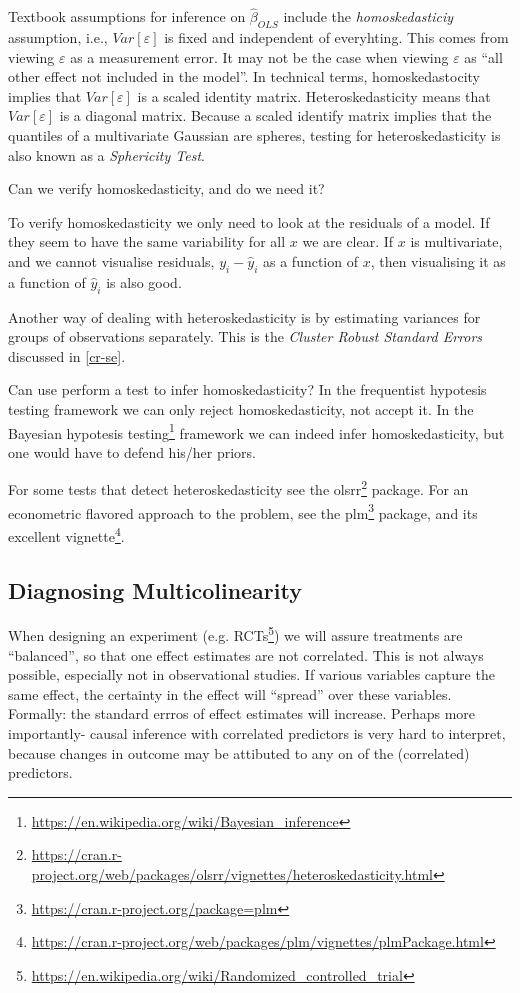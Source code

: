 \documentclass[]{book}
\renewcommand{\href}[2]{#2\footnote{\url{#1}}}
\theoremstyle{definition}
\theoremstyle{definition}
\theoremstyle{definition}
\theoremstyle{remark}
\begin{document}
Textbook assumptions for inference on \(\hat \beta_{OLS}\) include the \emph{homoskedasticiy} assumption, i.e., \(Var[\varepsilon]\) is fixed and independent of everyhting.
This comes from viewing \(\varepsilon\) as a measurement error.
It may not be the case when viewing \(\varepsilon\) as ``all other effect not included in the model''.
In technical terms, homoskedastocity implies that \(Var[\varepsilon]\) is a scaled identity matrix.
Heteroskedasticity means that \(Var[\varepsilon]\) is a diagonal matrix.
Because a scaled identify matrix implies that the quantiles of a multivariate Gaussian are spheres, testing for heteroskedasticity is also known as a \emph{Sphericity Test}.

Can we verify homoskedasticity, and do we need it?

To verify homoskedasticity we only need to look at the residuals of a model. If they seem to have the same variability for all \(x\) we are clear.
If \(x\) is multivariate, and we cannot visualise residuals, \(y_i-\hat y_i\) as a function of \(x\), then visualising it as a function of \(\hat y_i\) is also good.

Another way of dealing with heteroskedasticity is by estimating variances for groups of observations separately.
This is the \emph{Cluster Robust Standard Errors} discussed in \ref{cr-se}.

Can use perform a test to infer homoskedasticity?
In the frequentist hypotesis testing framework we can only reject homoskedasticity, not accept it.
In the \href{https://en.wikipedia.org/wiki/Bayesian_inference}{Bayesian hypotesis testing} framework we can indeed infer homoskedasticity, but one would have to defend his/her priors.

For some tests that detect heteroskedasticity see the \href{https://cran.r-project.org/web/packages/olsrr/vignettes/heteroskedasticity.html}{olsrr} package.
For an econometric flavored approach to the problem, see the \href{https://cran.r-project.org/package=plm}{plm} package, and its excellent \href{https://cran.r-project.org/web/packages/plm/vignettes/plmPackage.html}{vignette}.

\hypertarget{diagnosing-multicolinearity}{%
\subsection{Diagnosing Multicolinearity}\label{diagnosing-multicolinearity}}

When designing an experiment (e.g. \href{https://en.wikipedia.org/wiki/Randomized_controlled_trial}{RCTs}) we will assure treatments are ``balanced'', so that one effect estimates are not correlated.
This is not always possible, especially not in observational studies.
If various variables capture the same effect, the certainty in the effect will ``spread'' over these variables.
Formally: the standard errros of effect estimates will increase.
Perhaps more importantly- causal inference with correlated predictors is very hard to interpret, because changes in outcome may be attibuted to any on of the (correlated) predictors.
\end{document}
